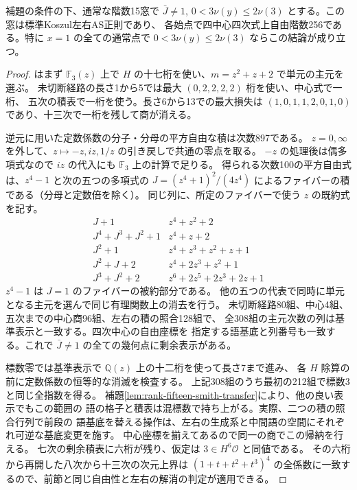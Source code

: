 \begin{theorem}\label{thm:rank-fifteen-ramified-pole}
補題の条件の下、通常な階数15窓で $\bar J\ne1$,
$0<3\nu(y)\le2\nu(3)$ とする。この窓は標準Koszul左右AS正則であり、
各始点で四中心四次式上自由階数256である。特に $x=1$ の全ての通常点で
$0<3\nu(y)\le2\nu(3)$ ならこの結論が成り立つ。
\end{theorem}
\begin{proof}
 はまず
$\mathbb F_3(z)$ 上で $H$ の十七桁を使い、$m=z^2+z+2$ で単元の主元を選ぶ。
未切断経路の長さ1から5では最大 $(0,2,2,2,2)$ 桁を使い、中心式で一桁、
五次の積表で一桁を使う。長さ6から13での最大損失は $(1,0,1,1,2,0,1,0)$
であり、十三次で一桁を残して商が消える。

逆元に用いた定数係数の分子・分母の平方自由な積は次数897である。
$z=0,\infty$ を外して、$z\mapsto-z,iz,1/z$ の引き戻しで共通の零点を取る。
$-z$ の処理後は偶多項式なので $iz$ の代入にも $\mathbb F_3$ 上の計算で足りる。
得られる次数100の平方自由式は、$z^4-1$ と次の五つの多項式の
$J=(z^4+1)^2/(4z^4)$ によるファイバーの積である（分母と定数倍を除く）。
同じ列に、所定のファイバーで使う $z$ の既約式を記す。
\[
\begin{array}{c|l}
 J+1 & z^4+z^2+2\\
 J^4+J^3+J^2+1 & z^4+z+2\\
 J^2+1 & z^4+z^3+z^2+z+1\\
 J^2+J+2 & z^4+2z^3+z^2+1\\
 J^3+J^2+2 & z^6+2z^5+2z^3+2z+1
\end{array}
\]
$z^4-1$ は $J=1$ のファイバーの被約部分である。
他の五つの代表で同時に単元となる主元を選んで同じ有理関数上の消去を行う。
未切断経路80組、中心4組、五次までの中心商96組、左右の積の照合128組で、
全308組の主元次数の列は基準表示と一致する。四次中心の自由座標を
指定する語基底と列番号も一致する。これで $\bar J\ne1$ の全ての幾何点に剰余表示がある。

標数零では基準表示で $\mathbb Q(z)$ 上の十二桁を使って長さ7まで進み、
各 $H$ 除算の前に定数係数の恒等的な消滅を検査する。
上記308組のうち最初の212組で標数3と同じ全指数を得る。
補題\ref{lem:rank-fifteen-smith-transfer}により、他の良い表示でもこの範囲の
語の格子と積表は混標数で持ち上がる。実際、二つの積の照合行列で前段の
語基底を替える操作は、左右の生成系と中間語の空間にそれぞれ可逆な基底変更を施す。
中心座標を揃えてあるので同一の商でこの帰納を行える。
七次の剰余積表に六桁が残り、仮定は $3\in H^6\mathcal O$ と同値である。
その六桁から再開した八次から十三次の次元上界は
$(1+t+t^2+t^3)^4$ の全係数に一致するので、前節と同じ自由性と左右の解消の判定が適用できる。
\end{proof}

